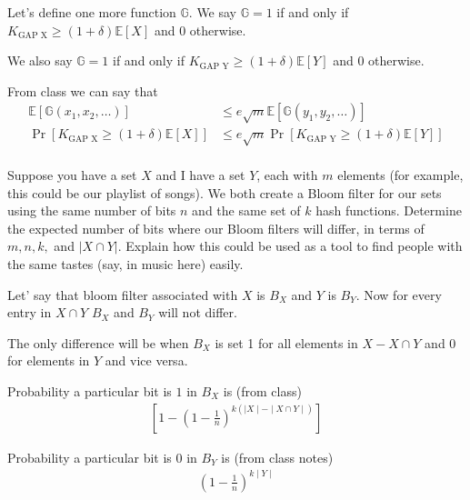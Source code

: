 \documentclass[addpoints,12pt]{exam}
\begin{document}
\begin{questions}
\begin{parts}
\begin{solution}
                Let's define one more function $\mathbb{G}$.
                We say $\mathbb{G} = 1$ if and only if $K_{\text{GAP X}} \geq (1 + \delta) \mathbb{E}[X]$ and $0$ otherwise.
                
                We also say $\mathbb{G} = 1$ if and only if $K_{\text{GAP Y}} \geq (1 + \delta) \mathbb{E}[Y]$ and $0$ otherwise.

                From class we can say that
                \begin{align*}
                    \mathbb{E}[\mathbb{G}(x_1, x_2, \dots)] &\leq e \sqrt{m} \mathbb{E}[\mathbb{G}(y_1, y_2, \dots)]\\
                    \Pr\left[K_{\text{GAP X}} \geq (1 + \delta) \mathbb{E}[X]\right] &\leq e \sqrt{m}\Pr\left[K_{\text{GAP Y}} \geq (1 + \delta) \mathbb{E}[Y]\right]\\
                \end{align*}
			\end{solution}
		\end{parts}
	
		\question[3] Suppose you have a set $X$ and I have a set $Y$, each with $m$ elements (for example, this could be our playlist of songs). We both create a Bloom filter for our sets using the same number of bits $n$ and the same set of $k$ hash functions. Determine the expected number of bits where our Bloom filters will differ, in terms of $m,n, k,$ and $|X\cap Y|$. Explain how this could be used as a tool to find people with the same tastes (say, in music here) easily.
		\begin{solution}
			Let' say that bloom filter associated with $X$ is $B_X$ and $Y$ is $B_Y$. Now for every entry in $X\cap Y$ $B_X$ and $B_Y$ will not differ.
   
            The only difference will be when $B_X$ is set 1 for all elements in $X - X\cap Y$ and $0$ for elements in $Y$ and vice versa.

            Probability a particular bit is $1$ in $B_X$ is (from class)
            \begin{align*}
                \left[1 - \left(1 - \frac{1}{n}\right)^{k (\mid X\mid - \mid X\cap Y \mid)}\right]
            \end{align*}

            Probability a particular bit is $0$ in $B_Y$ is (from class notes)
            \begin{align*}
                \left(1 - \frac{1}{n}\right)^{k \mid Y\mid}
            \end{align*}


\end{solution}
\end{questions}
\end{document}
